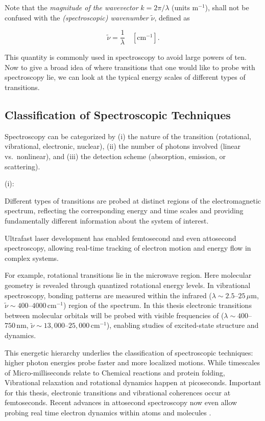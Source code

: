 \noindent 
Note that the \emph{magnitude of the wavevector } $k = 2\pi/\lambda$ (units m$^{-1}$), shall not be confused with the \emph{(spectroscopic) wavenumber} $\tilde{\nu}$, defined as

\begin{equation}
	\tilde{\nu} = \frac{1}{\lambda} \quad [\mathrm{cm}^{-1}].
	\label{eq:wavenumber_definition}
\end{equation}

This quantity is commonly used in spectroscopy to avoid large powers of ten. 
Now to give a broad idea of where transitions that one would like to probe with spectroscopy lie, we can look at the typical energy scales of different types of transitions.

\subsection{Classification of Spectroscopic Techniques}

\noindent
Spectroscopy can be categorized by (i) the nature of the transition (rotational, vibrational, electronic, nuclear), (ii) the number of photons involved (linear vs.\ nonlinear), and (iii) the detection scheme (absorption, emission, or scattering). 

\noindent
(i):

\noindent
Different types of transitions are probed at distinct regions of the electromagnetic spectrum, reflecting the corresponding energy and time scales and providing fundamentally different information about the system of interest. 

\noindent
Ultrafast laser development has enabled femtosecond and even attosecond spectroscopy, allowing real-time tracking of electron motion and energy flow in complex systems.

\noindent
For example, rotational transitions lie in the microwave region. Here molecular geometry is revealed through quantized rotational energy levels. In vibrational spectroscopy, bonding patterns are measured within the infrared ($\lambda\!\sim\!2.5$–$25\,\mu\mathrm{m}$, $\tilde{\nu}\!\sim\!400$–$4000\,\mathrm{cm^{-1}}$) region of the spectrum. In this thesis electronic transitions between molecular orbitals will be probed with visible frequencies of  ($\lambda\!\sim\!400$–$750\,\mathrm{nm}$, $\tilde{\nu}\!\sim\!13{,}000$–$25{,}000\,\mathrm{cm^{-1}}$), enabling studies of excited-state structure and dynamics.

\noindent
This energetic hierarchy underlies the classification of spectroscopic techniques: higher photon energies probe faster and more localized motions.
While timescales of Micro-milliseconds relate to  Chemical reactions and protein folding, Vibrational relaxation and rotational dynamics happen at picoseconds. Important for this thesis, electronic transitions and vibrational coherences occur at femtoseconds. Recent advances in attosecond spectroscopy now even allow probing real time electron dynamics within atoms and molecules \cite{rupprechtetal2025tracinglonglivedatomic}.

